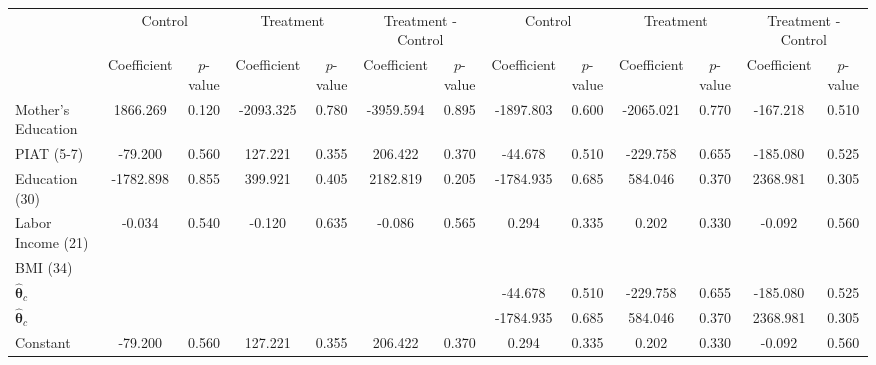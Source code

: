 \begin{tabular}{lcccccccccccc} \toprule
&\multicolumn{2}{c}{Control} & \multicolumn{2}{c}{Treatment} & \multicolumn{2}{c}{Treatment - Control} & \multicolumn{2}{c}{Control} & \multicolumn{2}{c}{Treatment} & \multicolumn{2}{c}{Treatment - Control} \\
 & Coefficient  & $p$-value  & Coefficient  & $p$-value & Coefficient  & $p$-value  & Coefficient  & $p$-value  & Coefficient  & $p$-value  & Coefficient  & $p$-value \\ \midrule
Mother's Education &  1866.269 &     0.120 & -2093.325 &     0.780 & -3959.594 &     0.895 & -1897.803 &     0.600 & -2065.021 &     0.770 &  -167.218 &     0.510 \\  
PIAT (5-7) &   -79.200 &     0.560 &   127.221 &     0.355 &   206.422 &     0.370 &   -44.678 &     0.510 &  -229.758 &     0.655 &  -185.080 &     0.525 \\  
Education (30) & -1782.898 &     0.855 &   399.921 &     0.405 &  2182.819 &     0.205 & -1784.935 &     0.685 &   584.046 &     0.370 &  2368.981 &     0.305 \\  
Labor Income (21) &    -0.034 &     0.540 &    -0.120 &     0.635 &    -0.086 &     0.565 &     0.294 &     0.335 &     0.202 &     0.330 &    -0.092 &     0.560 \\  
BMI (34)  &         &         &         &         &         &         &         &         &         &         &         &          \\  
$\hat{\bm{\theta}}_c$ &         &         &         &         &         &         &   -44.678 &     0.510 &  -229.758 &     0.655 &  -185.080 &     0.525 \\  
$\hat{\bm{\theta}}_c$ &         &         &         &         &         &         & -1784.935 &     0.685 &   584.046 &     0.370 &  2368.981 &     0.305 \\  
Constant &   -79.200 &     0.560 &   127.221 &     0.355 &   206.422 &     0.370 &     0.294 &     0.335 &     0.202 &     0.330 &    -0.092 &     0.560 \\  
\bottomrule \end{tabular}
